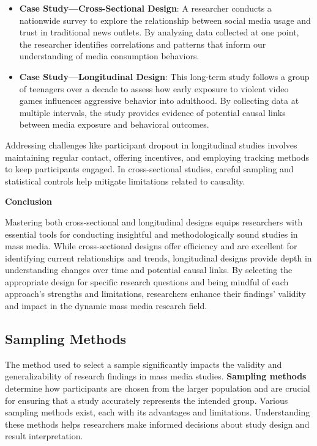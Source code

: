 \documentclass[
]{book}
\begin{document}
\begin{itemize}
\item
  \textbf{Case Study---Cross-Sectional Design}: A researcher conducts a nationwide survey to explore the relationship between social media usage and trust in traditional news outlets. By analyzing data collected at one point, the researcher identifies correlations and patterns that inform our understanding of media consumption behaviors.
\item
  \textbf{Case Study---Longitudinal Design}: This long-term study follows a group of teenagers over a decade to assess how early exposure to violent video games influences aggressive behavior into adulthood. By collecting data at multiple intervals, the study provides evidence of potential causal links between media exposure and behavioral outcomes.
\end{itemize}

Addressing challenges like participant dropout in longitudinal studies involves maintaining regular contact, offering incentives, and employing tracking methods to keep participants engaged. In cross-sectional studies, careful sampling and statistical controls help mitigate limitations related to causality.

\textbf{Conclusion}

Mastering both cross-sectional and longitudinal designs equips researchers with essential tools for conducting insightful and methodologically sound studies in mass media. While cross-sectional designs offer efficiency and are excellent for identifying current relationships and trends, longitudinal designs provide depth in understanding changes over time and potential causal links. By selecting the appropriate design for specific research questions and being mindful of each approach's strengths and limitations, researchers enhance their findings' validity and impact in the dynamic mass media research field.

\subsection*{Sampling Methods}\label{sampling-methods}

The method used to select a sample significantly impacts the validity and generalizability of research findings in mass media studies. \textbf{Sampling methods} determine how participants are chosen from the larger population and are crucial for ensuring that a study accurately represents the intended group. Various sampling methods exist, each with its advantages and limitations. Understanding these methods helps researchers make informed decisions about study design and result interpretation.
\end{document}
